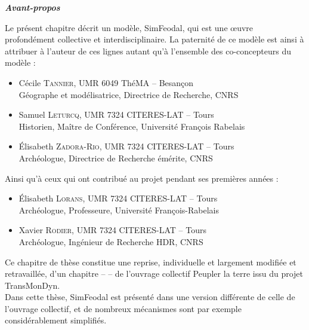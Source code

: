 \begin{mdframed}[backgroundcolor=black!5,footnoteinside=false]
\textbf{\hypertarget{avant-propos}{\textit{Avant-propos}}}\vspace{-0.3cm}

Le présent chapitre décrit un modèle, SimFeodal, qui est une œuvre profondément collective et interdisciplinaire.
La paternité de ce modèle est ainsi à attribuer à l'auteur de ces lignes autant qu'à l'ensemble des co-concepteurs du modèle :
\begin{itemize}\vspace{-0.15cm}
	\item Cécile \textsc{Tannier}, UMR 6049 ThéMA -- Besançon\\
	Géographe et modélisatrice, Directrice de Recherche, CNRS
	\item Samuel \textsc{Leturcq}, UMR 7324 CITERES-LAT -- Tours\\
	Historien, Maître de Conférence, Université François Rabelais
	\item Élisabeth \textsc{Zadora-Rio}, UMR 7324 CITERES-LAT -- Tours\\
	Archéologue, Directrice de Recherche émérite, CNRS
\end{itemize}\vspace{-0.15cm}
Ainsi qu'à ceux qui ont contribué au projet pendant ses premières années :\vspace{-0.15cm}
\begin{itemize}
	\item Élisabeth \textsc{Lorans}, UMR 7324 CITERES-LAT -- Tours\\
	Archéologue, Professeure, Université François-Rabelais
	\item Xavier \textsc{Rodier}, UMR 7324 CITERES-LAT -- Tours\\
	Archéologue, Ingénieur de Recherche HDR, CNRS
\end{itemize}\vspace{-0.15cm}
Ce chapitre de thèse constitue une reprise, individuelle et largement modifiée et retravaillée, d'un chapitre --  \autocite{cura_transition_2017} -- de l'ouvrage collectif \og Peupler la terre\fg{} \autocite{sanders2018peupler} issu du projet TransMonDyn\footnotemark.\\
Dans cette thèse, SimFeodal est présenté dans une version différente de celle de l'ouvrage collectif, et de nombreux mécanismes sont par exemple considérablement simplifiés.

\end{mdframed}
